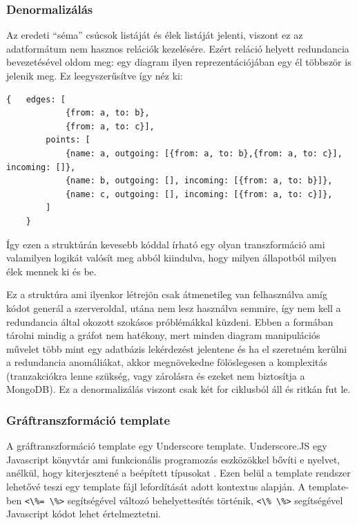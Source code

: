 \subsubsection{Denormalizálás}

Az eredeti ``séma'' csúcsok listáját és élek listáját jelenti, viszont ez az adatformátum nem hasznos relációk kezelésére. Ezért reláció helyett redundancia bevezetésével oldom meg: egy diagram ilyen reprezentációjában egy él többször is jelenik meg. Ez leegyszerűsítve így néz ki:

\begin{lstlisting}[caption=Denormalizált -- vagy redundáns -- séma]
    {   edges: [
            {from: a, to: b},
            {from: a, to: c}],
        points: [
            {name: a, outgoing: [{from: a, to: b},{from: a, to: c}], incoming: []},
            {name: b, outgoing: [], incoming: [{from: a, to: b}]},
            {name: c, outgoing: [], incoming: [{from: a, to: c}]},
        ]
    }
\end{lstlisting}

Így ezen a struktúrán kevesebb kóddal írható egy olyan transzformáció ami valamilyen logikát valósít meg abból kiindulva, hogy milyen állapotból milyen élek mennek ki és be. 

Ez a struktúra ami ilyenkor létrejön csak átmenetileg van felhasználva amíg kódot generál a szerveroldal, utána nem lesz használva semmire, így nem kell a redundancia által okozott szokásos próblémákkal küzdeni. Ebben a formában tárolni mindig a gráfot nem hatékony, mert minden diagram manipulációs művelet több mint egy adatbázis lekérdezést jelentene és ha el szeretném kerülni a redundancia anomáliákat, akkor megnövekedne fölöslegesen a komplexitás (tranzakciókra lenne szükség, vagy zárolásra és ezeket nem biztosítja a MongoDB). Ez a denormalizálás viszont csak két for ciklusból áll és ritkán fut le. 

\subsubsection{Gráftranszformáció template}

A gráftranszformáció template egy Underscore template. Underscore.JS egy Javascript könyvtár ami funkcionális programozás eszközökkel bővíti e nyelvet, anélkül, hogy kiterjesztené a beépített típusokat \cite{underscorejs.org}.
Ezen belül a template rendszer lehetővé teszi egy template fájl lefordítását adott kontextus alapján. A template-ben \lstinline{<\%= \%>} segítségével változó behelyettesítés történik, \lstinline{<\% \%>} segítségével Javascript kódot lehet értelmeztetni. 

